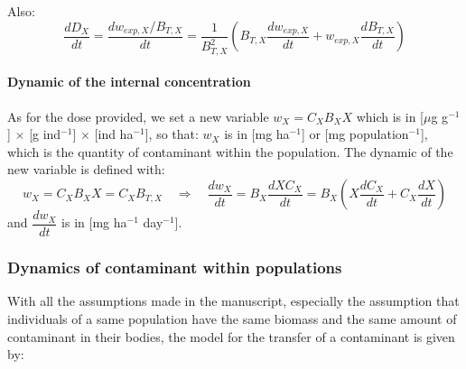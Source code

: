 \documentclass[11pt]{article}
\begin{document}
Also:
%
\begin{equation}
\frac{dD_X}{dt} = \frac{dw_{exp,X}/B_{T,X}}{dt} = \dfrac{1}{B^2_{T,X}} \left( B_{T,X} \frac{dw_{exp,X}}{dt} + w_{exp,X} \frac{dB_{T,X}}{dt} \right)
\end{equation}
%

\paragraph{Dynamic of the internal concentration}
%
As for the dose provided, we set a new variable $w_X = C_X B_X X$ which is in [$\mu$g g$^{-1}$] $\times$ [g ind$^{-1}$] $\times$ [ind ha$^{-1}$], so that:
%
$w_X$ is in [mg ha$^{-1}$] or [mg population$^{-1}$], which is the quantity of contaminant within the population.
%
The dynamic of the new variable is defined with:
%
\begin{equation}
w_X = C_X B_X X = C_X B_{T,X} \quad \Rightarrow \quad \frac{dw_X}{dt} = B_X \frac{dX C_X}{dt} = B_X \left( X \frac{dC_X}{dt} + C_X \frac{dX}{dt} \right)
\end{equation}
%
and $\dfrac{dw_X}{dt}$ is in [mg ha$^{-1}$ day$^{-1}$].
%



\subsubsection{Dynamics of contaminant within populations}

With all the assumptions made in the manuscript, especially the assumption that individuals of a same population have the same biomass and the same amount of contaminant in their bodies, the model for the transfer of a contaminant  is given by:
%
\end{document}

